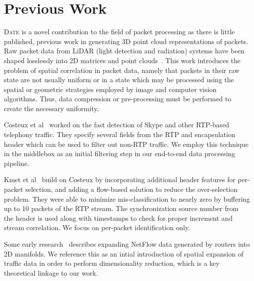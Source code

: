 \section{Previous Work}

\textsc{Date} is a novel contribution to the field of packet processing as there is little published, previous work in generating 3D point cloud representations of packets. Raw packet data from LiDAR (light detection and radiation) systems have been shaped losslessly into 2D matrices and point clouds~\cite{Tu2019point}. This work introduces the problem of spatial correlation in packet data, namely that packets in their raw state are not usually uniform or in a state which may be processed using the spatial or geometric strategies employed by image and computer vision algorithms. Thus, data compression or pre-processing must be performed to create the necessary uniformity.

Costeux et al~\cite{costeux2006detection} worked on the fast detection of Skype and other RTP-based telephony traffic. They specify several fields from the RTP and encapsulation header which can be used to filter out non-RTP traffic. We employ this technique in the middlebox as an initial filtering step in our end-to-end data processing pipeline.

Kmet et al~\cite{kmetfast} build on Costeux by incorporating additional header features for per-packet selection, and adding a flow-based solution to reduce the over-selection problem. They were able to minimize mis-classification to nearly zero by buffering up to 10 packets of the RTP stream. The synchronization source number from the header is used along with timestamps to check for proper increment and stream correlation. We focus on per-packet identification only.

Some early research~\cite{patwari2005manifold} describes expanding NetFlow data generated by routers into 2D manifolds. We reference this as an intial introduction of spatial expansion of traffic data in order to perform dimensionality reduction, which is a key theoretical linkage to our work.
